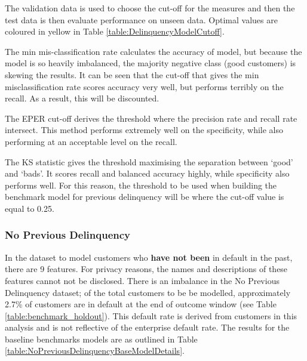 The validation data is used to choose the cut-off for the measures and then the test data is then evaluate performance on unseen data. Optimal values are coloured in yellow in Table \ref{table:DelinquencyModelCutoff}.

The min mis-classification rate calculates the accuracy of model, but because the model is so heavily imbalanced, the majority negative class (good customers) is skewing the results. It can be seen that the cut-off that gives the min misclassification rate scores accuracy very well, but performs terribly on the recall. As a result, this will be discounted.

The EPER cut-off derives the threshold where the precision rate and recall rate intersect. This method performs extremely well on the specificity, while also performing at an acceptable level on the recall.

The KS statistic gives the threshold maximising the separation between `good' and `bads'. It scores recall and balanced accuracy highly, while specificity also performs well. For this reason, the threshold to be used when building the benchmark model for previous delinquency will be where the cut-off value is equal to 0.25.


\subsubsection{No Previous Delinquency}

In the dataset to model customers who \textbf{have not been} in default in the past, there are 9 features. For privacy reasons, the names and descriptions of these features cannot not be disclosed. There is an imbalance in the No Previous Delinquency dataset; of the total customers to be be modelled, approximately 2.7\% of customers are in default at the end of outcome window (see Table \ref{table:benchmark_holdout}). This default rate is derived from customers in this analysis and is not reflective of the enterprise default rate. The results for the baseline benchmarks models are as outlined in Table \ref{table:NoPreviousDelinquencyBaseModelDetails}.

